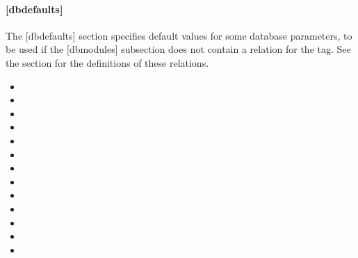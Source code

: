 \documentclass[letterpaper,10pt,english]{sphinxmanual}
\begin{document}
\begin{description}
\end{description}


\paragraph{{[}dbdefaults{]}}
\label{\detokenize{admin/conf_files/kdc_conf:id2}}\label{\detokenize{admin/conf_files/kdc_conf:dbdefaults}}
The {[}dbdefaults{]} section specifies default values for some database
parameters, to be used if the {[}dbmodules{]} subsection does not contain
a relation for the tag.  See the {\hyperref[\detokenize{admin/conf_files/kdc_conf:dbmodules}]{}} section for the
definitions of these relations.
\begin{itemize}
\item {} 

\item {} 

\item {} 

\item {} 

\item {} 

\item {} 

\item {} 

\item {} 

\item {} 

\item {} 

\item {} 

\item {} 

\item {} 

\end{itemize}
\end{document}
